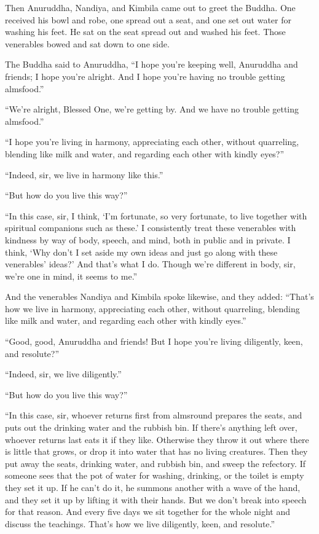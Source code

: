 \documentclass[12pt,openany]{book}%
\begin{document}
Then Anuruddha, Nandiya, and Kimbila came out to greet the Buddha. One received his bowl and robe, one spread out a seat, and one set out water for washing his feet. He sat on the seat spread out and washed his feet. Those venerables bowed and sat down to one side. 

The Buddha said to Anuruddha, “I hope you’re keeping well, Anuruddha and friends; I hope you’re alright. And I hope you’re having no trouble getting almsfood.” 

“We’re alright, Blessed One, we’re getting by. And we have no trouble getting almsfood.” 

“I hope you’re living in harmony, appreciating each other, without quarreling, blending like milk and water, and regarding each other with kindly eyes?” 

“Indeed, sir, we live in harmony like this.” 

“But how do you live this way?” 

“In this case, sir, I think, ‘I’m fortunate, so very fortunate, to live together with spiritual companions such as these.’ I consistently treat these venerables with kindness by way of body, speech, and mind, both in public and in private. I think, ‘Why don’t I set aside my own ideas and just go along with these venerables’ ideas?’ And that’s what I do. Though we’re different in body, sir, we’re one in mind, it seems to me.” 

And the venerables Nandiya and Kimbila spoke likewise, and they added: “That’s how we live in harmony, appreciating each other, without quarreling, blending like milk and water, and regarding each other with kindly eyes.” 

“Good, good, Anuruddha and friends! But I hope you’re living diligently, keen, and resolute?” 

“Indeed, sir, we live diligently.” 

“But how do you live this way?” 

“In this case, sir, whoever returns first from almsround prepares the seats, and puts out the drinking water and the rubbish bin. If there’s anything left over, whoever returns last eats it if they like. Otherwise they throw it out where there is little that grows, or drop it into water that has no living creatures. Then they put away the seats, drinking water, and rubbish bin, and sweep the refectory. If someone sees that the pot of water for washing, drinking, or the toilet is empty they set it up. If he can’t do it, he summons another with a wave of the hand, and they set it up by lifting it with their hands. But we don’t break into speech for that reason. And every five days we sit together for the whole night and discuss the teachings. That’s how we live diligently, keen, and resolute.” 
\end{document}
